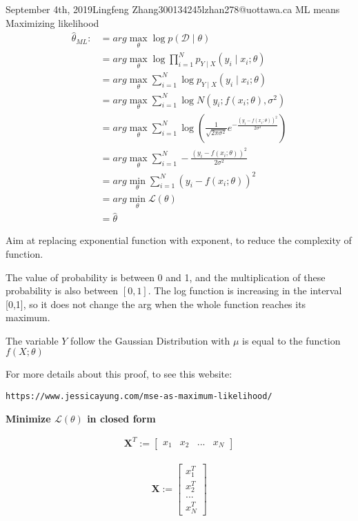 \documentclass{article}
\begin{document}
\begin{lecture}{September 4th, 2019}{Lingfeng Zhang}{300134245}{lzhan278@uottawa.ca}
ML means Maximizing likelihood
\begin{align*}
\hat\theta_{ML} :&= arg\max\limits_{\theta}\log p(\mathcal{D}\mid\theta)\\&= arg\max\limits_{\theta}\log \prod_{i=1}^{N} p_{Y\mid X}(y_i\mid x_i;\theta)\\ &= arg\max\limits_{\theta} \sum_{i=1}^{N}\log p_{Y\mid X}(y_i\mid x_i;\theta)\\&= arg\max\limits_{\theta} \sum_{i=1}^{N}\log N(y_i;f(x_i;\theta ),\sigma ^2)\\&= arg\max\limits_{\theta} \sum_{i=1}^{N}\log (\frac{1}{\sqrt{2\pi \sigma ^2}} e ^{ -\frac{(y_i-f(x_i;\theta ))^2}{2\sigma ^2}} ) \\&= arg\max\limits_{\theta} \sum_{i=1}^{N} -\frac{(y_i-f(x_i;\theta ))^2}{2\sigma ^2} \\&= arg\min\limits_{\theta} \sum_{i=1}^{N} (y_i-f(x_i;\theta ))^2\\&= arg\min\limits_{\theta}\mathcal{L}(\theta)\\&=\hat{\theta}
\end{align*}


Aim at replacing exponential function with exponent, to reduce the complexity of function.

The value of probability is between 0 and 1, and the multiplication of these probability is also between $[0,1]$. The log function is increasing in the interval [0,1], so it does not change the arg when the whole function reaches its maximum. 


The variable $Y$ follow the Gaussian Distribution with $\mu$ is equal to the function $f(X;\theta)$ 

For more details about this proof, to see this website: 

\texttt{https://www.jessicayung.com/mse-as-maximum-likelihood/}

\textbf{Minimize $\mathcal{L}(\theta)$ in closed form}

\begin{eqnarray}
\textbf{X}^T := 
\left[ {\begin{array}{cccc}
   x_1 &
   x_2 &
   ... &
   x_N
  \end{array} } \right]
\end{eqnarray}
  
\begin{eqnarray}\textbf{X} := 
\left[ {\begin{array}{c}
   x_1^T \\
   x_2^T \\
   ... \\
   x_N^T
  \end{array} } \right]\end{eqnarray}
  

\end{lecture}
\end{document}

